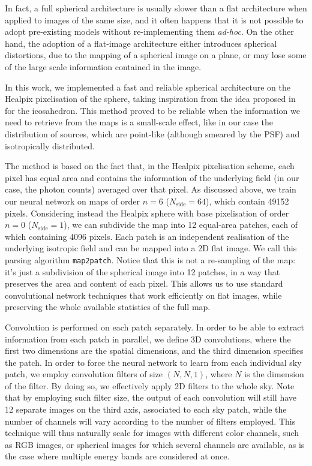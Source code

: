In fact, a full spherical architecture is usually slower than a flat architecture when applied to images of the same size, and it often happens that it is not possible to adopt pre-existing models without re-implementing them \textit{ad-hoc}. 
On the other hand, the adoption of a flat-image architecture either introduces spherical distortions, due to the mapping of a spherical image on a plane, or may lose some of the large scale information contained in the image.

In this work, we  implemented a fast and reliable spherical architecture on the Healpix pixelisation of the sphere, taking inspiration from the idea proposed in \cite{mapped-convolutions} for the icosahedron. This method proved to be reliable when the information we need to retrieve from the maps is a small-scale effect, like in our case the distribution of sources, which are point-like (although smeared by the PSF) and isotropically distributed.


The method is based on the fact that, in the Healpix pixelisation scheme, each pixel has equal area and contains the information of the underlying field (in our case, the photon counts) averaged over that pixel. As discussed above, we train our neural network on maps of order $n=6$ ($N_\textrm{side}=64$), which contain 49152 pixels. Considering instead the Healpix sphere with base pixelisation  of order $n=0$ ($N_\textrm{side}=1$), we can subdivide the map into 12 equal-area patches, each of which containing 4096 pixels. Each patch is an independent realisation of the underlying isotropic field and can be mapped into a 2D flat image. We call this parsing algorithm \verb|map2patch|. Notice that this is not a re-sampling of the map: it's just a subdivision of the spherical image into 12 patches, in a way that preserves the area and content of each pixel. This allows us to use standard convolutional network techniques that work efficiently on flat images, while preserving the whole available statistics of the full map.  


Convolution is performed on each patch separately. In order to be able to extract information from each patch in parallel, we define 3D convolutions, where the first two dimensions are the spatial dimensions, and the third dimension specifies the patch. In order to force the neural network to learn from each individual sky patch, we employ convolution filters of size $(N,N,1)$, where $N$ is the dimension of the filter. By doing so, we effectively apply 2D filters to the whole sky. Note that by employing such filter size, the output of each convolution will still have 12 separate images on the third axis, associated to each sky patch, while the number of channels will vary according to the number of filters employed. This technique will thus naturally scale for images with different color channels, such as RGB images, or spherical images for which several channels are available, as is the case where multiple energy bands are considered at once.

